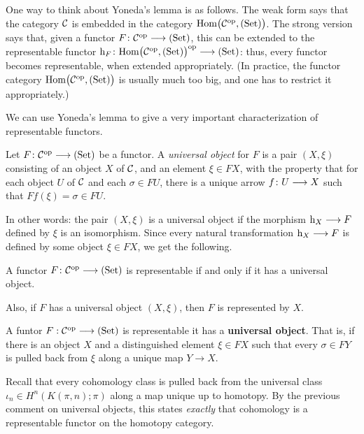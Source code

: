 \begin{2   CONTRAVARIANT FUNCTORS}
\begin{2.1 Yoneda Lemma}
One way to think about Yoneda's lemma is as follows. The weak form says that the category $\mathcal{C}$ is embedded in the category $\mathrm{Hom}\bigl(\mathcal{C}^{\mathrm{op}}, (\mathrm{Set})\bigr)$. The strong version says that, given a functor $F \colon \cC\op \arr \catset$, this can be extended to the representable functor $\h_F \colon \func{\cC}\op \arr \catset$: thus, every functor becomes representable, when extended appropriately. (In practice, the functor category $\mathrm{Hom}\bigl(\mathcal{C}^{\mathrm{op}}, (\mathrm{Set})\bigr)$ is usually much too big, and one has to restrict it appropriately.)

We can use Yoneda's lemma to give a very important characterization of representable functors.

\begin{definition} Let $F \colon \cC\op \arr \catset$ be a functor. A \emph{universal object}%
%
 for $F$ is a pair $(X, \xi)$ consisting of an object $X$ of $\mathcal{C}$, and an element $\xi \in F X$, with the property that for each object $U$ of $\mathcal{C}$ and each $\sigma\in F U$, there is a unique arrow $f \colon U \arr X$ such that $F f(\xi) = \sigma \in F U$.
\end{definition}

In other words: the pair $(X, \xi)$ is a universal object if the morphism $\h_X \arr F$ defined by $\xi$ is an isomorphism. Since every natural transformation $\h_X \arr F$ is defined by some object $\xi \in F X$, we get the following.

\begin{proposition}
A functor $F \colon \cC\op \arr \catset$ is representable if and only if it has a universal object.
\end{proposition}

Also, if $F$ has a universal object $(X, \xi)$, then $F$ is represented by $X$.
\begin{shaded}
A funtor $F:\mathcal{C}^{\mathrm{op}}\longrightarrow(\mathrm{Set})$ is representable \Iff it has a \textbf{universal object}. That is, if there is an object $X$ and a distinguished element $\xi\in FX$ such that every $\sigma\in FY$ is pulled back from $\xi$ along a unique map $Y\to X$. 

Recall that every cohomology class is pulled back from the universal class $\iota_n\in H^n(K(\pi,n);\pi)$ along a map unique up to homotopy. By the previous comment on universal objects, this states \emph{exactly} that cohomology is a representable functor on the homotopy category.
\end{shaded}



\end{2.1 Yoneda Lemma}
\end{2   CONTRAVARIANT FUNCTORS}
